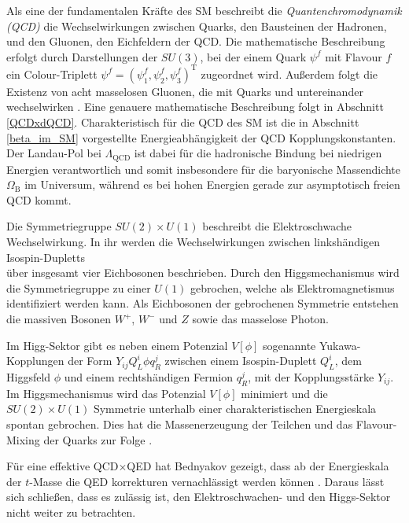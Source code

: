     Als eine der fundamentalen Kräfte des SM beschreibt die 
    \textit{Quantenchromodynamik (QCD)} die Wechselwirkungen 
    zwischen Quarks, den Bausteinen der Hadronen, und den Gluonen, den 
    Eichfeldern der QCD. Die mathematische Beschreibung erfolgt durch 
    Darstellungen der $SU(3)$, bei der einem Quark $\psi^f$ mit Flavour $f$ ein 
    Colour-Triplett $\psi^f = \left(\psi^f_1, \psi_2^f, \psi_3^f\right)^\text{T}$ 
    zugeordnet wird. 
    Außerdem folgt die Existenz von acht masselosen Gluonen, die mit Quarks und 
    untereinander wechselwirken \cite{Ellis_Webber}. Eine genauere 
    mathematische Beschreibung folgt in Abschnitt \ref{QCDxdQCD}. 
    Charakteristisch für die QCD des SM ist die in Abschnitt \ref{beta_im_SM} 
    vorgestellte Energieabhängigkeit 
    der QCD Kopplungskonstanten. Der Landau-Pol bei $\Lambda_\text{QCD}$ ist 
    dabei für die hadronische Bindung bei niedrigen Energien verantwortlich 
    und somit insbesondere für die baryonische Massendichte $\Omega_\text{B}$ 
    im Universum, während es bei hohen Energien gerade zur asymptotisch 
    freien QCD kommt.
    
    Die Symmetriegruppe $SU(2)\times U(1)$ beschreibt die Elektroschwache 
    Wechselwirkung. In ihr werden die Wechselwirkungen zwischen  
    linkshändigen Isospin-Dupletts 
    \begin{equation}
      
    \end{equation}
    über insgesamt vier Eichbosonen beschrieben. Durch den Higgsmechanismus 
    wird die Symmetriegruppe zu einer $U(1)$ gebrochen, welche als 
    Elektromagnetismus identifiziert werden kann. Als Eichbosonen der 
    gebrochenen Symmetrie entstehen die massiven Bosonen $W^+$, $W^-$ und $Z$ 
    sowie das masselose Photon.
    
    Im Higg-Sektor gibt es neben einem Potenzial $V[\phi]$ sogenannte 
    Yukawa-Kopplungen der 
    Form $Y_{ij} Q_L^i \phi q_R^j $
    zwischen einem Isospin-Duplett $Q_L^i$, dem Higgsfeld $\phi$ und einem 
    rechtshändigen Fermion $q_R^j$, mit der Kopplungsstärke $Y_{ij}$. Im 
    Higgsmechanismus wird das 
    Potenzial $V[\phi]$ minimiert und die $SU(2)\times U(1)$ Symmetrie 
    unterhalb einer charakteristischen Energieskala spontan gebrochen. Dies hat 
    die Massenerzeugung der Teilchen und das Flavour-Mixing der Quarks zur 
    Folge \cite{PDG:Higgs}.
    
    Für eine effektive QCD$\times$QED 
    hat Bednyakov gezeigt, dass ab der Energieskala der $t$-Masse die QED 
    korrekturen vernachlässigt werden können \cite{Bednyakov2015262}. Daraus 
    lässt sich schließen, dass es zulässig ist, den Elektroschwachen- und 
    den Higgs-Sektor nicht weiter zu betrachten. 
    

